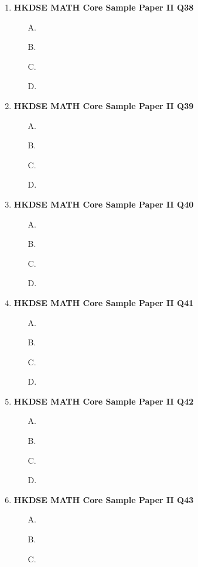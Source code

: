 \documentclass[12pt]{article}
\begin{document}
\begin{enumerate}
	\item \textbf{HKDSE MATH Core Sample Paper II Q38}\\
	\begin{enumerate}
		\item[A.]
		\item[B.]
		\item[C.]
		\item[D.]
	\end{enumerate}
	\item \textbf{HKDSE MATH Core Sample Paper II Q39}\\
	\begin{enumerate}
		\item[A.]
		\item[B.]
		\item[C.]
		\item[D.]
	\end{enumerate}
	\item \textbf{HKDSE MATH Core Sample Paper II Q40}\\
	\begin{enumerate}
		\item[A.]
		\item[B.]
		\item[C.]
		\item[D.]
	\end{enumerate}
	\item \textbf{HKDSE MATH Core Sample Paper II Q41}\\
	\begin{enumerate}
		\item[A.]
		\item[B.]
		\item[C.]
		\item[D.]
	\end{enumerate}
	\item \textbf{HKDSE MATH Core Sample Paper II Q42}\\
	\begin{enumerate}
		\item[A.]
		\item[B.]
		\item[C.]
		\item[D.]
	\end{enumerate}
	\item \textbf{HKDSE MATH Core Sample Paper II Q43}\\
	\begin{enumerate}
		\item[A.]
		\item[B.]
		\item[C.]

\end{enumerate}
\end{enumerate}
\end{document}
